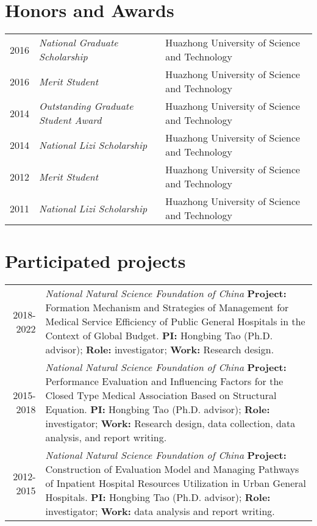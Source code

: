 \documentclass[a4paper,10pt]{article}
\begin{document}
\section{Honors and Awards}
\begin{tabular}{rll}
2016 & \textit{National Graduate Scholarship} & Huazhong University of Science and Technology\\
2016 & \textit{Merit Student} &  Huazhong University of Science and Technology\\
2014 & 	\textit{Outstanding Graduate Student Award} & Huazhong University of Science and Technology\\
2014 & 	\textit{National Lizi Scholarship} &  Huazhong University of Science and Technology\\
2012 & 	\textit{Merit Student} & Huazhong University of Science and Technology\\
2011 & 	\textit{National Lizi Scholarship} & Huazhong University of Science and Technology
\end{tabular}

\section{Participated projects}
\begin{tabular}{r p{12cm}}
2018-2022 & \emph{National Natural Science Foundation of China } \textbf{Project:} Formation Mechanism and Strategies of Management for Medical Service Efficiency of Public General Hospitals in the Context of Global Budget.  \textbf{PI:} Hongbing Tao (Ph.D. advisor); \textbf{Role: }investigator; \textbf{Work:} Research design.\\
2015-2018 & \emph{National Natural Science Foundation of China }  \textbf{Project:} Performance Evaluation and Influencing Factors for the Closed Type Medical Association Based on Structural Equation. \textbf{PI:} Hongbing Tao (Ph.D. advisor); \textbf{Role:} investigator; \textbf{Work:} Research design, data collection, data analysis, and report writing.\\
2012-2015 & \emph{National Natural Science Foundation of China } \textbf{Project:} Construction of Evaluation Model and Managing Pathways of Inpatient Hospital Resources Utilization in Urban General Hospitals. \textbf{PI:} Hongbing Tao (Ph.D. advisor); \textbf{Role:} investigator; \textbf{Work:} data analysis and report writing.
\end{tabular}

\end{document}
